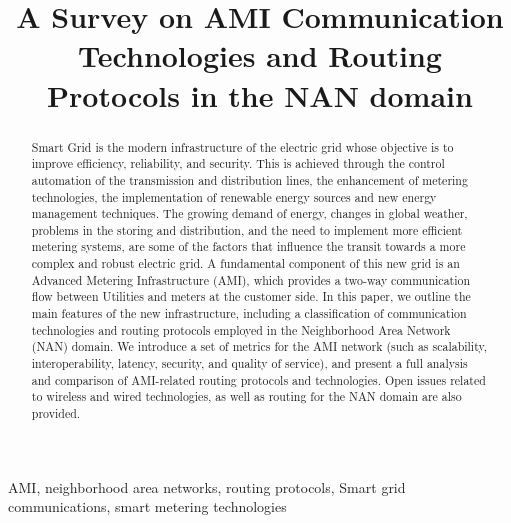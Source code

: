 \documentclass[10pt,twocolumn,twoside,submit]{JCNtran}
\begin{document}




\title{A Survey on AMI Communication Technologies and Routing Protocols in the NAN domain}
\author{
}


\begin{abstract}
Smart Grid is the modern infrastructure of the electric grid whose objective is to improve efficiency, reliability, and security. This is achieved through the control automation of the transmission and distribution lines, the enhancement of metering technologies, the implementation of renewable energy sources and new energy management techniques. The growing demand of energy, changes in global weather, problems in the storing and distribution, and the need to implement more efficient metering systems, are some of the factors that influence the transit towards a more complex and robust electric grid. A fundamental component of this new grid is an Advanced Metering Infrastructure (AMI), which provides a two-way communication flow between Utilities and meters at the customer side. In this paper, we outline the main features of the new infrastructure, including a classification of communication technologies and routing protocols employed in the Neighborhood Area Network (NAN) domain. We introduce a set of metrics for the AMI network (such as scalability, interoperability, latency, security, and quality of service), and present a full analysis and comparison of AMI-related routing protocols and technologies. Open issues related to wireless and wired technologies, as well as routing for the NAN domain are also provided.
\end{abstract}

\begin{keywords}
AMI, neighborhood area networks, routing protocols, Smart grid communications, smart metering technologies
\end{keywords}
\end{document}
